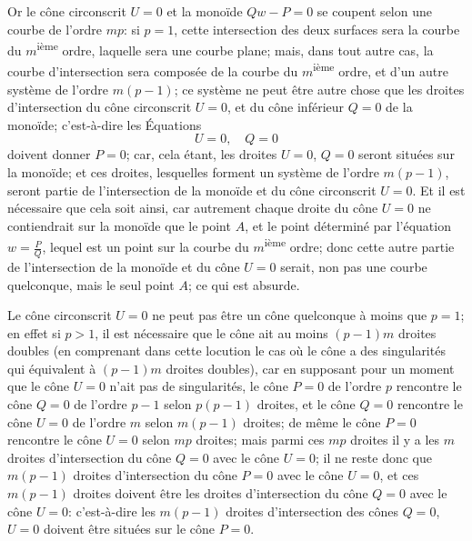 \documentclass[11pt,a4paper]{article}
\begin{document}
Or le c\^{o}ne circonscrit $U = 0$ et la mono\"{i}de $Qw - P = 0$ se coupent selon une courbe de l'ordre $mp$: si $p = 1$, cette intersection des deux surfaces sera la courbe du $m$\textsuperscript{i\`{e}me} ordre, laquelle sera une courbe plane; mais, dans tout autre cas, la courbe d'intersection sera compos\'{e}e de la courbe du $m$\textsuperscript{i\`{e}me} ordre, et d'un autre syst\`{e}me de l'ordre $m(p-1)$; ce syst\`{e}me ne peut \^{e}tre autre chose que les droites d'intersection du c\^{o}ne circonscrit $U = 0$, et du c\^{o}ne inf\'{e}rieur $Q = 0$ de la mono\"{i}de; c'est-\`{a}-dire les \'{E}quations
\[
U = 0, \quad Q = 0
\]
doi\-vent donner $P = 0$; car, cela \'{e}tant, les droites $U = 0$, $Q = 0$ seront situ\'{e}es sur la mono\"{i}de; et ces droites, lesquelles forment un syst\`{e}me de l'ordre $m(p-1)$, seront partie de l'intersection de la mono\"{i}de et du c\^{o}ne circonscrit $U = 0$. Et il est n\'{e}cessaire que cela soit ainsi, car autrement chaque droite du c\^{o}ne $U = 0$ ne contiendrait sur la mono\"{i}de que le point $A$, et le point d\'{e}termin\'{e} par l'\'{e}quation $w = \frac{P}{Q}$, lequel est un point sur la courbe du $m$\textsuperscript{i\`{e}me} ordre; donc cette autre partie de l'intersection de la mono\"{i}de et du c\^{o}ne $U = 0$ serait, non pas une courbe quelconque, mais le seul point $A$; ce qui est absurde.

Le c\^{o}ne circonscrit $U = 0$ ne peut pas \^{e}tre un c\^{o}ne quelconque \`{a} moins que $p = 1$; en effet si $p > 1$, il est n\'{e}cessaire que le c\^{o}ne ait au moins $(p-1)m$ droites doubles (en comprenant dans cette locution le cas o\`{u} le c\^{o}ne a des singularit\'{e}s qui \'{e}quivalent \`{a} $(p-1)m$ droites doubles), car en supposant pour un moment que le c\^{o}ne $U = 0$ n'ait pas de singularit\'{e}s, le c\^{o}ne $P = 0$ de l'ordre $p$ rencontre le c\^{o}ne $Q = 0$ de l'ordre $p - 1$ selon $p(p-1)$ droites, et le c\^{o}ne $Q = 0$ rencontre le c\^{o}ne $U = 0$ de l'ordre $m$ selon $m(p-1)$ droites; de m\^{e}me le c\^{o}ne $P = 0$ rencontre le c\^{o}ne $U = 0$ selon $mp$ droites; mais parmi ces $mp$ droites il y a les $m$ droites d'intersection du c\^{o}ne $Q = 0$ avec le c\^{o}ne $U = 0$; il ne reste donc que $m(p-1)$ droites d'intersection du c\^{o}ne $P = 0$ avec le c\^{o}ne $U = 0$, et ces $m(p-1)$ droites doivent \^{e}tre les droites d'intersection du c\^{o}ne $Q = 0$ avec le c\^{o}ne $U = 0$: c'est-\`{a}-dire les $m(p-1)$ droites d'intersection des c\^{o}nes $Q = 0$, $U = 0$ doivent \^{e}tre situ\'{e}es sur le c\^{o}ne $P = 0$.
\end{document}
